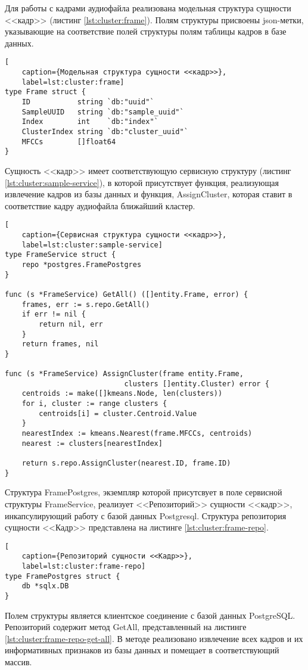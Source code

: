 Для работы с кадрами аудиофайла реализована модельная структура сущности <<кадр>> (листинг  \ref{lst:cluster:frame}). Полям структуры присвоены json-метки, указывающие на соответствие полей структуры полям таблицы кадров в базе данных.
\begin{lstlisting}[
	caption={Модельная структура сущности <<кадр>>},
	label=lst:cluster:frame]
type Frame struct {
    ID           string `db:"uuid"`
    SampleUUID   string `db:"sample_uuid"`
    Index        int    `db:"index"`
    ClusterIndex string `db:"cluster_uuid"`
    MFCCs        []float64
}
\end{lstlisting}
Сущность <<кадр>> имеет соответствующую сервисную структуру (листинг \ref{lst:cluster:sample-service}), в которой присутствует функция, реализующая извлечение кадров из базы данных и функция, AssignCluster, которая ставит в соответствие кадру аудиофайла ближайший кластер.
\begin{lstlisting}[
	caption={Сервисная структура сущности <<кадр>>},
	label=lst:cluster:sample-service]
type FrameService struct {
	repo *postgres.FramePostgres
}

func (s *FrameService) GetAll() ([]entity.Frame, error) {
	frames, err := s.repo.GetAll()
	if err != nil {
		return nil, err
	}
	return frames, nil
}

func (s *FrameService) AssignCluster(frame entity.Frame, 
							clusters []entity.Cluster) error {
	centroids := make([]kmeans.Node, len(clusters))
	for i, cluster := range clusters {
		centroids[i] = cluster.Centroid.Value
	}
	nearestIndex := kmeans.Nearest(frame.MFCCs, centroids)
	nearest := clusters[nearestIndex]
	
	return s.repo.AssignCluster(nearest.ID, frame.ID)
}
\end{lstlisting}
Структура FramePostgres, экземпляр которой присутсвует в поле сервисной структуры FrameService, реализует <<Репозиторий>> сущности <<кадр>>,  инкапсулирующий работу с базой данных Postgresql. Структура репозитория сущности <<Кадр>> представлена на листинге \ref{lst:cluster:frame-repo}.
\begin{lstlisting}[
	caption={Репозиторий сущности <<Кадр>>},
	label=lst:cluster:frame-repo]
type FramePostgres struct {
	db *sqlx.DB
}
\end{lstlisting}
Полем структуры является клиентское соединение с базой данных PostgreSQL. Репозиторий содержит метод GetAll, представленный на листинге \ref{lst:cluster:frame-repo-get-all}. В методе реализовано извлечение всех кадров и их информативных признаков из базы данных и помещает в соответствующий массив.
